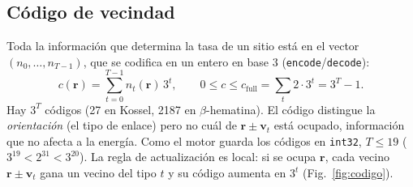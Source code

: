 \documentclass[11pt,a4paper]{article}
\newcommand{\code}[1]{\texttt{#1}}
\newcommand{\vect}[1]{\mathbf{#1}}
\newcommand{\bh}{$\beta$-hematina}
\begin{document}
\subsection{Código de vecindad}

Toda la información que determina la tasa de un sitio está en el vector $(n_0,\dots,n_{T-1})$, que
se codifica en un entero en base 3 (\code{encode}/\code{decode}):
\begin{equation}
c(\vect r)=\sum_{t=0}^{T-1} n_t(\vect r)\,3^t,\qquad 0\le c\le c_{\mathrm{full}}=\sum_t 2\cdot 3^t=3^T-1 .
\label{eq:codigo}
\end{equation}
Hay $3^T$ códigos (27 en Kossel, 2187 en \bh{}). El código distingue la \emph{orientación} (el tipo
de enlace) pero no cuál de $\vect r\pm\vect v_t$ está ocupado, información que no afecta a la
energía. Como el motor guarda los códigos en \code{int32}, $T\le19$ ($3^{19}<2^{31}<3^{20}$).
La regla de actualización es local: si se ocupa $\vect r$, cada vecino $\vect r\pm\vect v_t$ gana un
vecino del tipo $t$ y su código aumenta en $3^t$ (Fig.~\ref{fig:codigo}).
\end{document}
